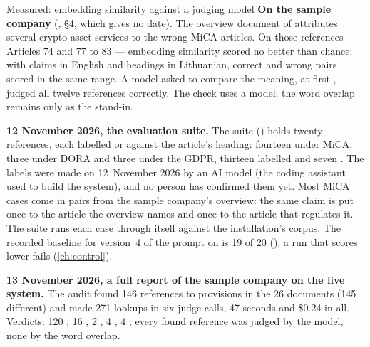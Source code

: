 \begin{lessonbox}{Measured: embedding similarity against a judging model}
\textbf{On the sample company} (, §4, which gives no date). The
overview document of \demo{} attributes several crypto-asset services to the wrong MiCA
articles. On those references --- Articles 74 and 77 to 83 --- embedding similarity scored no
better than chance: with claims in English and headings in Lithuanian, correct and wrong pairs
scored in the same range. A model asked to compare the meaning, at first
, judged all twelve references correctly. The check uses a model; the word
overlap remains only as the stand-in.

\textbf{12 November 2026, the evaluation suite.} The suite 
() holds twenty references, each labelled
 or  against the article's heading: fourteen under MiCA, three under
DORA and three under the GDPR, thirteen labelled  and seven . The
labels were made on 12~November 2026 by an AI model (the coding assistant used to build the
system), and no person has confirmed them yet. Most
MiCA cases come in pairs from the sample company's overview: the same claim is put once to the
article the overview names and once to the article that regulates it. The suite runs each case
through  itself against the installation's corpus. The recorded baseline
for version~4 of the prompt on  is 19 of 20
(); a run that scores lower fails (\cref{ch:control}).

\textbf{13 November 2026, a full report of the sample company on the live system.} The audit
found 146 references to provisions in the 26 documents (145 different) and made 271 lookups in
six judge calls, 47 seconds and \$0.24 in all. Verdicts: 120 , 16 ,
2 , 4 , 4 ; every found reference was
judged by the model, none by the word overlap.
\end{lessonbox}

